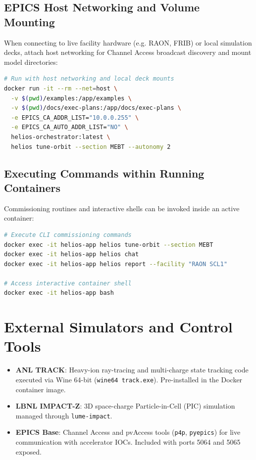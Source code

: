 \documentclass[11pt,a4paper]{report}
\begin{document}
\subsection{EPICS Host Networking and Volume Mounting}
When connecting to live facility hardware (e.g. RAON, FRIB) or local simulation decks, attach host networking for Channel Access broadcast discovery and mount model directories:
\begin{lstlisting}[language=bash]
# Run with host networking and local deck mounts
docker run -it --rm --net=host \
  -v $(pwd)/examples:/app/examples \
  -v $(pwd)/docs/exec-plans:/app/docs/exec-plans \
  -e EPICS_CA_ADDR_LIST="10.0.0.255" \
  -e EPICS_CA_AUTO_ADDR_LIST="NO" \
  helios-orchestrator:latest \
  helios tune-orbit --section MEBT --autonomy 2
\end{lstlisting}

\subsection{Executing Commands within Running Containers}
Commissioning routines and interactive shells can be invoked inside an active container:
\begin{lstlisting}[language=bash]
# Execute CLI commissioning commands
docker exec -it helios-app helios tune-orbit --section MEBT
docker exec -it helios-app helios chat
docker exec -it helios-app helios report --facility "RAON SCL1"

# Access interactive container shell
docker exec -it helios-app bash
\end{lstlisting}

\section{External Simulators and Control Tools}
\begin{itemize}
    \item \textbf{ANL TRACK}: Heavy-ion ray-tracing and multi-charge state tracking code executed via Wine 64-bit (\texttt{wine64 track.exe}). Pre-installed in the Docker container image.
    \item \textbf{LBNL IMPACT-Z}: 3D space-charge Particle-in-Cell (PIC) simulation managed through \texttt{lume-impact}.
    \item \textbf{EPICS Base}: Channel Access and pvAccess tools (\texttt{p4p}, \texttt{pyepics}) for live communication with accelerator IOCs. Included with ports 5064 and 5065 exposed.
\end{itemize}
\end{document}
